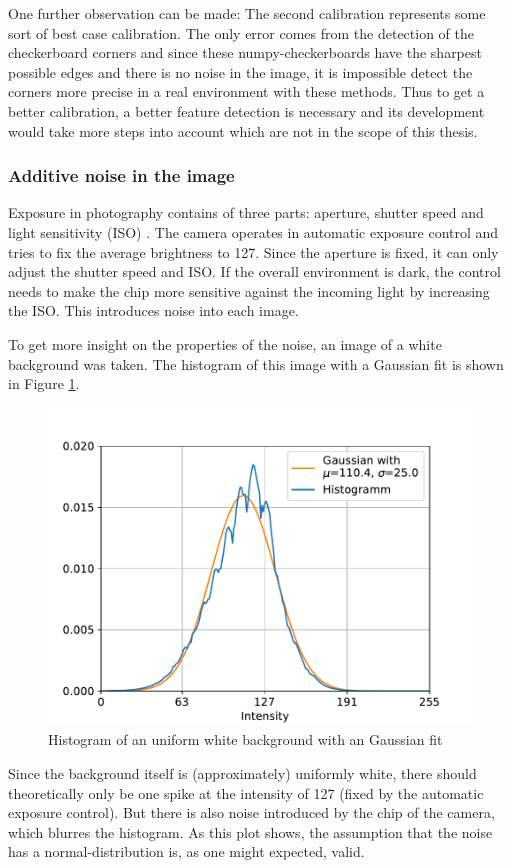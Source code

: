 One further observation can be made: The second calibration represents some sort of best case calibration.
The only error comes from the detection of the checkerboard corners and since these numpy-checkerboards have the sharpest possible edges and there is no noise in the image, it is impossible detect the corners more precise in a real environment with these methods.
Thus to get a better calibration, a better feature detection is necessary and its development would take more steps into account which are not in the scope of this thesis.

\subsubsection{Additive noise in the image} 
Exposure in photography contains of three parts: aperture, shutter speed and light sensitivity (ISO) \cite{exposure}.
The camera operates in automatic exposure control and tries to fix the average brightness to 127.
Since the aperture is fixed, it can only adjust the shutter speed and ISO.
If the overall environment is dark, the control needs to make the chip more sensitive against the incoming light by increasing the ISO.
This introduces noise into each image.

To get more insight on the properties of the noise, an image of a white background was taken.
The histogram of this image with a Gaussian fit is shown in Figure \ref{development:noise_dist}.
\begin{figure}
	\centering
	\includegraphics[width=0.9\linewidth]{3-development/calibration/images/noise_distribution.pdf}
	\caption{Histogram of an uniform white background with an Gaussian fit\label{development:noise_dist}}
\end{figure}
Since the background itself is (approximately) uniformly white, there should theoretically only be one spike at the intensity of 127 (fixed by the automatic exposure control).
But there is also noise introduced by the chip of the camera, which blurres the histogram.
As this plot shows, the assumption that the noise has a normal-distribution is, as one might expected, valid.


